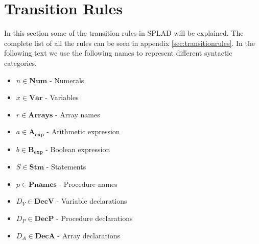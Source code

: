 

\section{Transition Rules}
In this section some of the transition rules in SPLAD will be explained. The complete list of all the rules can be seen in appendix \ref{sec:transitionrules}.
In the following text we use the following names to represent different syntactic categories.
\begin{itemize}
\item $n \in \textbf{Num}$ - Numerals
\item $x \in \textbf{Var}$ - Variables 
\item $r \in \textbf{Arrays}$ - Array names
\item $a \in \mathbf{A_{exp}}$ - Arithmetic expression
\item $b \in \mathbf{B_{exp}}$ - Boolean expression
\item $S \in \textbf{Stm}$ - Statements
\item $p \in \textbf{Pnames}$ - Procedure names
\item $D_V \in \textbf{DecV}$ - Variable declarations
\item $D_P \in \textbf{DecP}$ - Procedure declarations
\item $D_A \in \textbf{DecA}$ - Array declarations
\end{itemize}

